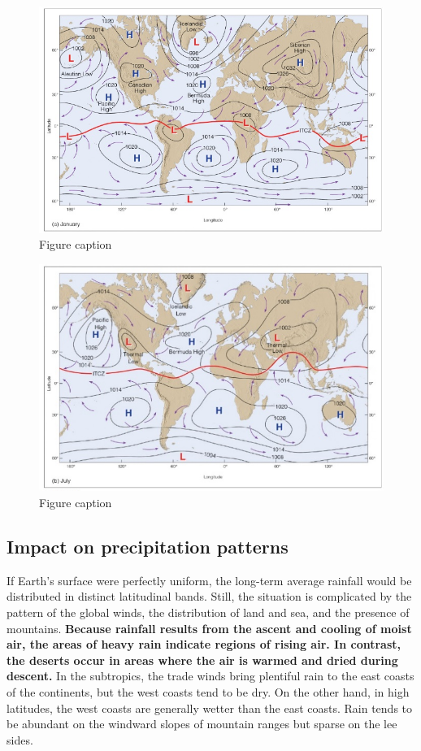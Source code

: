 \documentclass[12pt,oneside]{book}
\begin{document}
\begin{figure}

{\centering \includegraphics[width=0.8\linewidth]{figures/Figure513a} 

}

\caption{Figure caption}\label{fig:Fig513a}
\end{figure}\begin{figure}

{\centering \includegraphics[width=0.8\linewidth]{figures/Figure513b} 

}

\caption{Figure caption}\label{fig:Fig513b}
\end{figure}

\subsection{Impact on precipitation
patterns}\label{impact-on-precipitation-patterns}

If Earth's surface were perfectly uniform, the long-term average
rainfall would be distributed in distinct latitudinal bands. Still, the
situation is complicated by the pattern of the global winds, the
distribution of land and sea, and the presence of mountains.
\textbf{Because rainfall results from the ascent and cooling of moist
air, the areas of heavy rain indicate regions of rising air. In
contrast, the deserts occur in areas where the air is warmed and dried
during descent.} In the subtropics, the trade winds bring plentiful rain
to the east coasts of the continents, but the west coasts tend to be
dry. On the other hand, in high latitudes, the west coasts are generally
wetter than the east coasts. Rain tends to be abundant on the windward
slopes of mountain ranges but sparse on the lee sides.
\end{document}

